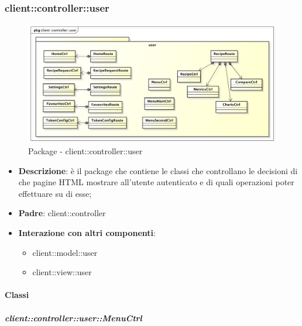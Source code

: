 


\subsubsection{client::controller::user} %
\label{ssub:bdsm_app_client_controller_user}
\begin{figure}[htbp]
	\centering
	\centerline{\includegraphics[scale=0.45]{./images/client/client_controller_user.pdf}}
	\caption{Package - client::controller::user}
\end{figure}

\begin{itemize}
	\item \textbf{Descrizione}: è il package che contiene le classi che controllano le decisioni di che pagine HTML mostrare all'utente autenticato e di quali operazioni poter effettuare su di esse;
	\item \textbf{Padre}: client::controller
	\item \textbf{Interazione con altri componenti}:
		\begin{itemize}
			\item client::model::user
			\item client::view::user
		\end{itemize}
\end{itemize}

	\paragraph{Classi} %
		\subparagraph{client::controller::user::MenuCtrl} %
		\label{subp:client_controller_user_menuctrl}

